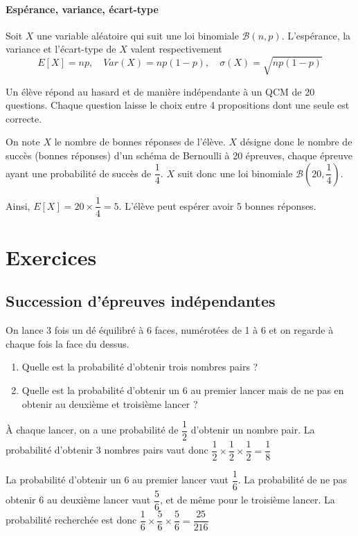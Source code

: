 \documentclass[11pt,fleqn, openany]{book} %
\begin{document}
\subsubsection{Espérance, variance, écart-type}

\begin{proposition}Soit $X$ une variable aléatoire qui suit une loi binomiale $\mathcal{B}(n,p)$. L'espérance, la variance et l'écart-type de $X$ valent respectivement \[E[X]=np, \quad Var(X)=np(1-p), \quad \sigma(X)=\sqrt{np(1-p)}\]\end{proposition}

\begin{example}Un élève répond au hasard et de manière indépendante à un QCM de 20 questions. Chaque question laisse le choix entre 4 propositions dont une seule est correcte.

On note $X$ le nombre de bonnes réponses de l'élève. $X$ désigne donc le nombre de succès (bonnes réponses) d'un schéma de Bernoulli à 20 épreuves, chaque épreuve ayant une probabilité de succès de $\dfrac{1}{4}$. $X$ suit donc une loi binomiale $\mathcal{B}\left(20,\dfrac{1}{4}\right)$.

Ainsi, $E[X]=20 \times \dfrac{1}{4}=5$. L'élève peut espérer avoir 5 bonnes réponses.\end{example}


\chapter{Exercices}

\section*{Succession d'épreuves indépendantes}

\begin{exercise}On lance 3 fois un dé équilibré à 6 faces, numérotées de 1 à 6 et on regarde à chaque fois la face du dessus.
\begin{enumerate}
\item Quelle est la probabilité d'obtenir trois nombres pairs ?
\item Quelle est la probabilité d'obtenir un 6 au premier lancer mais de ne pas en obtenir au deuxième et troisième lancer ?
\end{enumerate}\end{exercise}

\begin{solution}À chaque lancer, on a une probabilité de $\dfrac{1}{2}$ d'obtenir un nombre pair. La probabilité d'obtenir 3 nombres pairs vaut donc $\dfrac{1}{2} \times \dfrac{1}{2} \times \dfrac{1}{2}= \dfrac{1}{8}$

La probabilité d'obtenir un 6 au premier lancer vaut $\dfrac{1}{6}$. La probabilité de ne pas obtenir 6 au deuxième lancer vaut $\dfrac{5}{6}$, et de même pour le troisième lancer. La probabilité recherchée est donc $\dfrac{1}{6} \times \dfrac{5}{6} \times \dfrac{5}{6}=\dfrac{25}{216}$
\end{solution}
\end{document}

